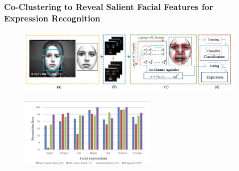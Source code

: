 \documentclass[11pt]{beamer}
\begin{document}
\begin{frame}
    \frametitle{Co-Clustering to Reveal Salient Facial Features for Expression Recognition}
    \begin{figure}[htbp]
        \centering
        \includegraphics[width=\textwidth]{khan.png}
    \end{figure}
    \begin{figure}[htbp]
        \centering
        \includegraphics[width=0.6\textwidth]{result.png}
    \end{figure}
\end{frame}

\end{document}
